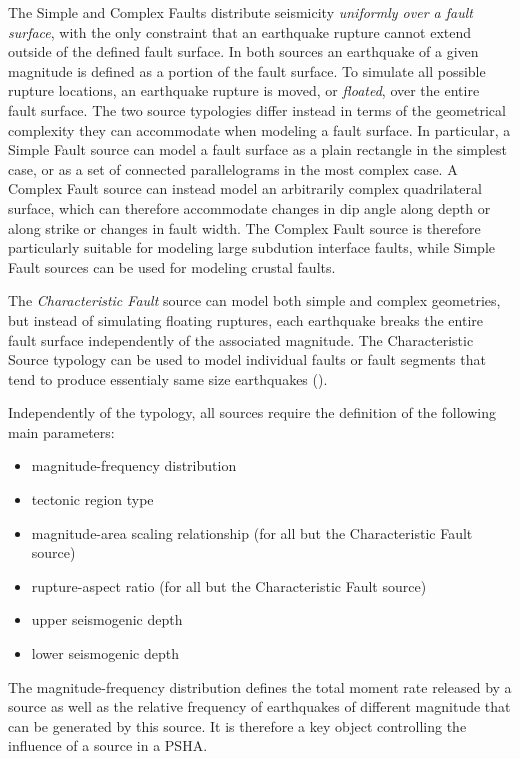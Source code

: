 The Simple and Complex Faults distribute seismicity \textit{uniformly over a
fault surface}, with the only constraint that an earthquake rupture cannot
extend outside of the defined fault surface. In both sources an earthquake of a
given magnitude is defined as a portion of the fault surface. 
%
To simulate all possible rupture locations, an earthquake rupture is moved, or
\textit{floated}, over the entire fault surface. The two source typologies
differ instead in terms of the geometrical complexity they can accommodate when
modeling a fault surface. In particular, a Simple Fault source can model a fault
surface as a plain rectangle in the simplest case, or as a set of connected
parallelograms in the most complex case. 
%
A Complex Fault source can instead model an arbitrarily complex
quadrilateral surface, which can therefore accommodate changes in dip angle
along depth or along strike or changes in fault width. The Complex Fault source
is therefore particularly suitable for modeling large subdution interface
faults, while Simple Fault sources can be used for modeling crustal faults. 

The \textit{Characteristic Fault} source can model both simple and complex
geometries, but instead of simulating floating ruptures, each earthquake breaks
the entire fault surface independently of the associated magnitude. The
Characteristic Source typology can be used to model individual faults or fault
segments that tend to produce essentialy same size earthquakes
(\cite{schwartscoppersmith1984}).

Independently of the typology, all sources require the definition of the
following main parameters:
\begin{itemize}
\item magnitude-frequency distribution
\item tectonic region type
\item magnitude-area scaling relationship (for all but the Characteristic Fault source)
\item rupture-aspect ratio (for all but the Characteristic Fault source)
\item upper seismogenic depth
\item lower seismogenic depth
\end{itemize}
%
The magnitude-frequency distribution defines the total moment rate released by a
source as well as the relative frequency of earthquakes of different magnitude
that can be generated by this source. It is therefore a key object
controlling the influence of a source in a PSHA. 

